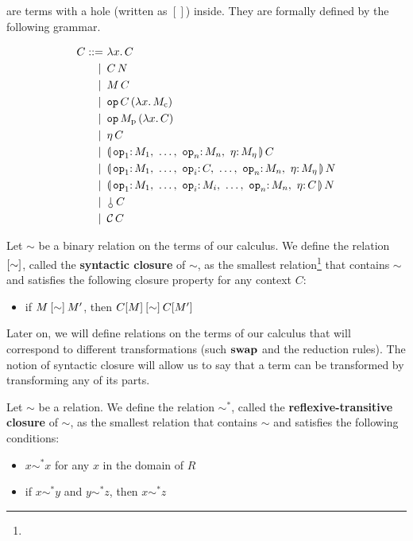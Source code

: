 \begin{definition}
   are terms with a hole (written as $[]$) inside. They are
  formally defined by the following grammar.

  \begin{align*}
  C ::= &\ \lam{x}{C} \\
   | \, &\ \ap{C}{N}  \\
   | \, &\ \ap{M}{C}  \\
   | \, &\ \app{\op{op}}{C}{(\lam{x}{M_{\mathrm{c}}})} \\
   | \, &\ \app{\op{op}}{M_{\mathrm{p}}}{(\lam{x}{C})} \\
   | \, &\ \ap{\eta}{C} \\
   | \, &\ \ap{\banana{\onto{\op{op}_1} M_1,\ \dots,\ \onto{\op{op}_n} M_n,\ \onto{\eta} M_\eta}}{C} \\
   | \, &\ \ap{\banana{\onto{\op{op}_1} M_1,\ \dots,\ \onto{\op{op}_i}{C},\ \dots,\ \onto{\op{op}_n} M_n,\ \onto{\eta} M_\eta}}{N} \\
   | \, &\ \ap{\banana{\onto{\op{op}_1} M_1,\ \dots,\ \onto{\op{op}_i}{M_i},\ \dots,\ \onto{\op{op}_n} M_n,\ \onto{\eta} C}}{N} \\
   | \, &\ \ap{\cherry}{C} \\
   | \, &\ \ap{\CC}{C}
  \end{align*}
\end{definition}

\begin{definition}
  Let $\sim$ be a binary relation on the terms of our calculus. We define
  the relation $\mathbin{[\sim]}$, called the \textbf{syntactic closure} of
  $\sim$, as the smallest relation\footnote{} that contains $\sim$ and satisfies
  the following closure property for any context $C$:

  \begin{itemize}
    \item if $M \mathbin{[\sim]} M'$, then $C[M] \mathbin{[\sim]} C[M']$
  \end{itemize}
\end{definition}

Later on, we will define relations on the terms of our calculus that will
correspond to different transformations (such $\mathbin{\textbf{swap}}$ and the reduction
rules). The notion of syntactic closure will allow us to say that a term
can be transformed by transforming any of its parts.

\begin{definition}
  Let $\sim$ be a relation. We define the relation $\sim^*$, called the
  \textbf{reflexive-transitive closure} of $\sim$, as the smallest relation
  that contains $\sim$ and satisfies the following conditions:

  \begin{itemize}
  \item $x \sim^* x$ for any $x$ in the domain of $R$
  \item if $x \sim^* y$ and $y \sim^* z$, then $x \sim^* z$
  \end{itemize}
\end{definition}

